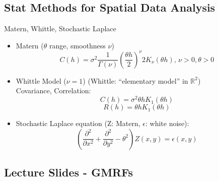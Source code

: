 \documentclass{article}
\begin{document}
\subsection*{Stat Methods for Spatial Data Analysis}
Matern, Whittle, Stochastic Laplace \citep{Schabenberger2004}
\begin{itemize}
\item Matern ($\theta$ range, smoothness $\nu$)
$$ C(h) = \sigma^{2}\frac{1}{\Gamma(\nu)}\left(\frac{\theta h}{2}\right)^{\nu}2K_{\nu}(\theta h) \text{,   } \nu >0, \theta > 0 $$
\item Whittle Model ($\nu = 1$) (Whittle: ``elementary model'' in $\mathbb{R}^{2}$) \\
Covariance, Correlation:
$$ C(h) = \sigma^{2}\theta h K_{1}(\theta h) $$
$$ R(h) = \theta h K_{1}(\theta h) $$
\item Stochastic Laplace equation (Z: Matern, $\epsilon$: white noise):
$$ \left( \frac{\partial^{2}}{\partial x^{2}} + \frac{\partial^{2}}{\partial y^{2}} - \theta^{2} \right) Z(x,y) = \epsilon(x,y) $$
\end{itemize}



\subsection*{Lecture Slides - GMRFs}
\citep{Lindstrom2014}
\end{document}
